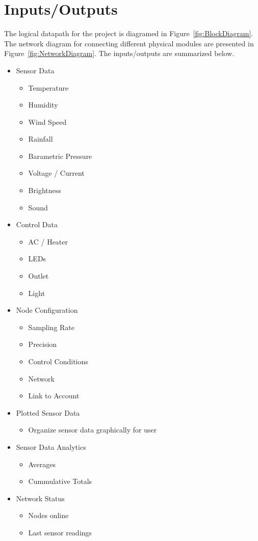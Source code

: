 	 \section{Inputs/Outputs}
		 The logical datapath for the project is diagramed in Figure~\ref{fig:BlockDiagram}. The network diagram for connecting different physical modules are presented in Figure~\ref{fig:NetworkDiagram}. The inputs/outputs are summarized below.
		 \begin{itemize}
		 	\item Sensor Data
		 	\begin{itemize}
		 		\item Temperature
		 		\item Humidity
		 		\item Wind Speed
		 		\item Rainfall
		 		\item Barametric Pressure
		 		\item Voltage / Current
		 		\item Brightness
		 		\item Sound
		 	\end{itemize}
		 	\item Control Data
		 	\begin{itemize}
		 		\item AC / Heater
		 		\item LEDs
		 		\item Outlet
		 		\item Light
		 	\end{itemize}
		 	\item Node Configuration
		 	\begin{itemize}
		 		\item Sampling Rate
		 		\item Precision
		 		\item Control Conditions
		 		\item Network
		 		\item Link to Account		 		
		 	\end{itemize}
		 	\item Plotted Sensor Data
		 	\begin{itemize}
		 		\item Organize sensor data graphically for user
		 	\end{itemize}
		 	\item Sensor Data Analytics
		 	\begin{itemize}
		 		\item Averages
		 		\item Cummulative Totals
		 	\end{itemize}
		 	\item Network Status
		 	\begin{itemize}
		 		\item Nodes online
		 		\item Last sensor readings
		 	\end{itemize}
		 \end{itemize}
	 
